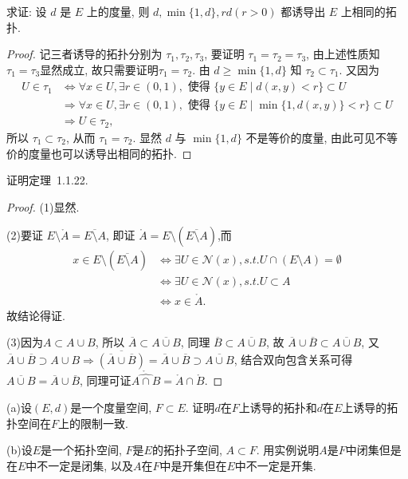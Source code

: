 求证: 设 $d$ 是 $E$ 上的度量, 则 $d,\min\{1,d\},rd(r>0)$ 都诱导出 $E$ 上相同的拓扑.
\begin{proof}
记三者诱导的拓扑分别为 $\tau_1,\tau_2,\tau_3$, 要证明 $\tau_1=\tau_2=\tau_3$,
由上述性质知$\tau_1=\tau_3$显然成立, 故只需要证明$\tau_1=\tau_2$.
由 $d\geq\min\{1,d\}$ 知 $\tau_2\subset\tau_1$. 又因为
\begin{align*}
    U\in\tau_1
    &\Leftrightarrow\forall x\in U,\exists r\in(0,1),\text{\ 使得\ }\{y\in E\mid d(x,y)<r\}\subset U \\
    &\Rightarrow\forall x\in U,\exists r\in(0,1),\text{\ 使得\ }\{y\in E\mid\min\{1,d(x,y)\}<r\}\subset U \\
    &\Rightarrow U\in\tau_2,
\end{align*}
所以 $\tau_1\subset\tau_2$, 从而 $\tau_1=\tau_2$.
显然 $d$ 与 $\min\{1,d\}$ 不是等价的度量, 由此可见不等价的度量也可以诱导出相同的拓扑.
\end{proof}

\begin{exercise}
证明定理~1.1.22.
\end{exercise}

\begin{proof}
(1)显然.

(2)要证 $E\setminus\mathring{A}=\overline{E\setminus A}$,
即证 $\mathring{A}=E\setminus(\overline{E\setminus A})$,而
\begin{align*}
    x\in E\setminus(\overline{E\setminus A})&\Leftrightarrow\exists U\in\mathcal{N}(x),s.t.U\cap(E\setminus A)=\emptyset\\
    &\Leftrightarrow\exists U\in\mathcal{N}(x),s.t.U\subset A\\
    &\Leftrightarrow x\in\mathring{A}.
\end{align*}
故结论得证.

(3)因为$A\subset A\cup B$, 所以 $\overline{A}\subset\overline{A\cup B}$,
同理 $\overline{B}\subset\overline{A\cup B}$,
故 $\overline{A}\cup\overline{B}\subset\overline{A\cup B}$,
又 $\overline{A}\cup\overline{B}\supset A\cup B\Rightarrow\overline{(\overline{A}\cup\overline{B})}=\overline{A}\cup\overline{B}\supset\overline{A\cup B}$,
结合双向包含关系可得 $\overline{A\cup B}=\overline{A}\cup\overline{B}$,
同理可证$\mathring{\widehat{A\cap B}}=\mathring{A}\cap\mathring{B}$.
\end{proof}

\begin{exercise}
(a)设$(E,d)$是一个度量空间, $F\subset E$. 证明$d$在$F$上诱导的拓扑和$d$在$E$上诱导的拓扑空间在$F$上的限制一致.

(b)设$E$是一个拓扑空间, $F$是$E$的拓扑子空间, $A\subset F$.
用实例说明$A$是$F$中闭集但是在$E$中不一定是闭集, 以及$A$在$F$中是开集但在$E$中不一定是开集.
\end{exercise}

